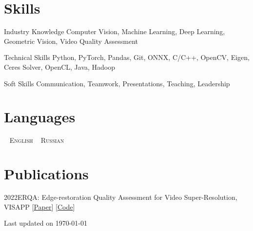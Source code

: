 \documentclass{tccv}
\newcommand{\updateinfo}[1][\today]{\par\vfill\hfill{\scriptsize\color{darkergray}Last updated on #1}}
\begin{document}
\section{Skills}

\begin{factlist}

\item{Industry Knowledge}
     {Computer Vision, Machine Learning, Deep Learning, Geometric Vision, Video Quality Assessment}

\item{Technical Skills}
     {Python, PyTorch, Pandas, Git, ONNX, C/C++, OpenCV, Eigen, Ceres Solver, OpenCL, Java, Hadoop}

\item{Soft Skills}
     {Communication, Teamwork, Presentations, Teaching, Leadership}

\end{factlist}

\section{Languages}

\faAngleDoubleRight~ \textsc{English}\qquad
\faAngleDoubleRight~ \textsc{Russian}

\section{Publications}

\begin{factlist}
     \item{2022}{ERQA: Edge-restoration Quality Assessment for Video Super-Resolution, VISAPP [\href{https://arxiv.org/abs/2110.09992}{Paper}] [\href{https://github.com/msu-video-group/ERQA}{Code}]}
\end{factlist}

\updateinfo
\end{document}
